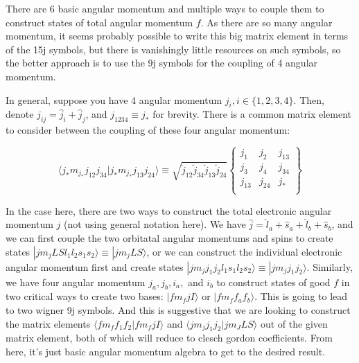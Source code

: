 \documentclass[prl, longbibliography, aps, 10pt]{revtex4-2}
\begin{document}
There are 6 basic angular momentum and multiple ways to couple them to construct states of total angular momentum $f$. As there are so many angular momentum, it seems probably possible to write this big matrix element in terms of the 15j symbols, but there is vanishingly little resources on such symbols, so the better approach is to use the 9j symbols for the coupling of 4 angular momentum. 

In general, suppose you have 4 angular momentum $j_i, i\in\{1,2,3,4\}$. Then, denote $\hat{j}_{ij}=\hat{j}_i+\hat{j}_j$, and $j_{1234}\equiv j_*$ for brevity. There is a common matrix element to consider between the coupling of these four angular momentum:

\begin{equation}
\langle j_{*} m_{j_{*}} j_{12}j_{34}|j_{*} m_{j_{*}}j_{13}j_{24}\rangle
\equiv\sqrt{\breve{j}_{12}\breve{j}_{34}\breve{j}_{13}\breve{j}_{24}}
\begin{Bmatrix}
j_1 & j_2 & j_{13}\\
j_3 & j_4 & j_{34}\\
j_{13} & j_{24} & j_{*}\\
\end{Bmatrix}
\end{equation} 

In the case here, there are two ways to construct the total electronic angular momentum $j$ (not using general notation here). We have $\hat{j}=\hat{l}_a+\hat{s}_a+\hat{l}_b+\hat{s}_b$, and we can first couple the two orbitatal angular momentums and spins to create states $|jm_j L S l_1 l_2 s_1 s_2 \rangle\equiv|j m_j L S\rangle$, or we can construct the individual electronic angular momentum first and create states $|j m_j j_1 j_2 l_1 s_1 l_2 s_2\rangle\equiv|j m_j j_1 j_2\rangle$. Similarly, we have four angular momentum $j_a, j_b, i_a, $ and $i_b$ to construct states of good $f$ in two critical ways to create two bases: $|f m_f j I\rangle$ or $|f m_f f_a f_b\rangle$. This is going to lead to two wigner 9j symbols. And this is suggestive that we are looking to construct the matrix elements $\langle f m_f f_1 f_2 | f m_f j I\rangle$ and $\langle j m_j j_1 j_2| j m_J L S\rangle$ out of the given matrix element, both of which will reduce to clesch gordon coefficients. From here, it's just basic angular momentum algebra to get to the desired result. 
\end{document}
